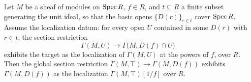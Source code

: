 

\begin{lemma}
  \label{lem:section_localization_descent_of_cover}
  \leanok
  Let \(M\) be a sheaf of modules on \(\operatorname{Spec} R\), \(f \in R\), and
  \(t \subseteq R\) a finite subset generating the unit ideal, so that the basic opens
  \(\{D(r)\}_{r \in t}\) cover \(\operatorname{Spec} R\). Assume the localization datum: for every open
  \(U\) contained in some \(D(r)\) with \(r \in t\), the section restriction
  \[
    \Gamma(M, U) \longrightarrow \Gamma\bigl(M, D(f) \cap U\bigr)
  \]
  exhibits the target as the localization of \(\Gamma(M, U)\) at the powers of \(f\),
  over \(R\). Then the global section restriction
  \(\Gamma(M, \top) \to \Gamma(M, D(f))\) exhibits \(\Gamma(M, D(f))\) as the
  localization \(\Gamma(M, \top)[1/f]\) over \(R\).
\end{lemma}
